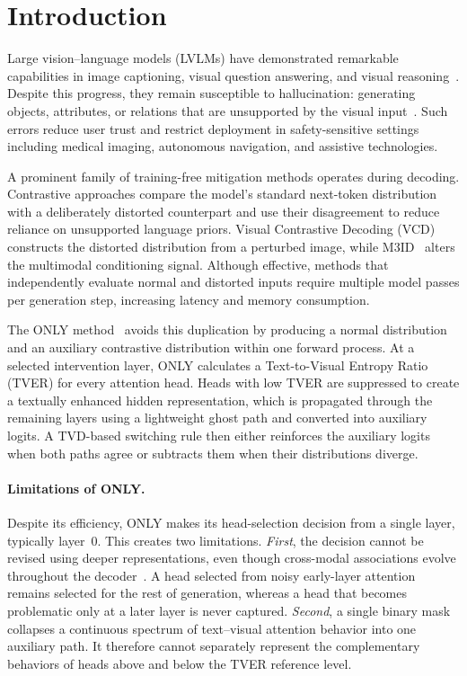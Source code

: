 \section{Introduction}
\label{sec:introduction}

Large vision--language models (LVLMs) have demonstrated remarkable capabilities in image captioning, visual question answering, and visual reasoning~\cite{alayrac2022flamingo,li2023blip2,liu2024visual}. Despite this progress, they remain susceptible to hallucination: generating objects, attributes, or relations that are unsupported by the visual input~\cite{rohrbach2018object,li2023pope}. Such errors reduce user trust and restrict deployment in safety-sensitive settings including medical imaging, autonomous navigation, and assistive technologies.

A prominent family of training-free mitigation methods operates during decoding. Contrastive approaches compare the model's standard next-token distribution with a deliberately distorted counterpart and use their disagreement to reduce reliance on unsupported language priors. Visual Contrastive Decoding (VCD)~\cite{leng2024mitigating} constructs the distorted distribution from a perturbed image, while M3ID~\cite{fayyaz2024m3id} alters the multimodal conditioning signal. Although effective, methods that independently evaluate normal and distorted inputs require multiple model passes per generation step, increasing latency and memory consumption.

The ONLY method~\cite{wan2025only} avoids this duplication by producing a normal distribution and an auxiliary contrastive distribution within one forward process. At a selected intervention layer, ONLY calculates a Text-to-Visual Entropy Ratio (TVER) for every attention head. Heads with low TVER are suppressed to create a textually enhanced hidden representation, which is propagated through the remaining layers using a lightweight ghost path and converted into auxiliary logits. A TVD-based switching rule then either reinforces the auxiliary logits when both paths agree or subtracts them when their distributions diverge.

\paragraph{Limitations of ONLY.}
Despite its efficiency, ONLY makes its head-selection decision from a single layer, typically layer~0. This creates two limitations. \emph{First}, the decision cannot be revised using deeper representations, even though cross-modal associations evolve throughout the decoder~\cite{abnar2020quantifying,clark2019does}. A head selected from noisy early-layer attention remains selected for the rest of generation, whereas a head that becomes problematic only at a later layer is never captured. \emph{Second}, a single binary mask collapses a continuous spectrum of text--visual attention behavior into one auxiliary path. It therefore cannot separately represent the complementary behaviors of heads above and below the TVER reference level.

